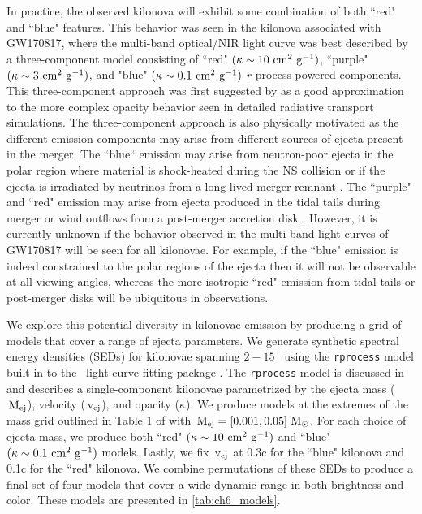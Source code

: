 In practice, the observed kilonova will exhibit some combination of both ``red" and ``blue" features. This behavior was seen in the kilonova associated with GW170817, where the multi-band optical/NIR light curve was best described by a three-component model consisting of ``red"  $(\kappa \sim10 \rm\ cm^2\ g^{-1})$, ``purple"  $(\kappa \sim3 \rm\ cm^2\ g^{-1})$, and "blue"  $(\kappa \sim0.1 \rm\ cm^2\ g^{-1})$ $r$-process powered components. This three-component approach was first suggested by \citet{Tanaka+17} as a good approximation to the more complex opacity behavior seen in detailed radiative transport simulations. The three-component approach is also physically motivated as the different emission components may arise from different sources of ejecta present in the merger. The ``blue`` emission may arise from neutron-poor ejecta in the polar region where material is shock-heated during the NS collision \citep{Oechslin+07,Bauswein+13a,Sekiguchi+16} or if the ejecta is irradiated by neutrinos from a long-lived merger remnant \citep{FernandezMetzger13,Just+15,Kasen+15}. The ``purple" and ``red" emission may arise from ejecta produced in the tidal tails during merger \cite{Rosswog+99,Hotokezaka+13} or wind outflows from a post-merger accretion disk \citep{Just+15,SiegelMetzger17}. However, it is currently unknown if the behavior observed in the multi-band light curves of GW170817 will be seen for all kilonovae. For example, if the ``blue" emission is indeed constrained to the polar regions of the ejecta then it will not be observable at all viewing angles, whereas the more isotropic ``red" emission from tidal tails or post-merger disks will be ubiquitous in observations.

We explore this potential diversity in kilonovae emission by producing a grid of models that cover a range of ejecta parameters. We generate synthetic spectral energy densities (SEDs) for kilonovae spanning $2-15$ \micron\ using the {\tt rprocess} model built-in to the \mosfit\ light curve fitting package \citep{Guillochon+17b,Nicholl+17b}. The {\tt rprocess} model is discussed in \citet{Villar+17a} and describes a single-component kilonovae \citep{Metzger2017} parametrized by the ejecta mass ($\rm\,M_{\rm ej}$), velocity ($\rm\,v_{\rm ej}$), and opacity ($\kappa$). We produce models at the extremes of the mass grid outlined in Table 1 of \citet{Barnes+16} with $\rm\,M_{\rm ej} = [0.001, 0.05]\,{\rm\,M_\odot}$. For each choice of ejecta mass, we produce both ``red" $(\kappa \sim10 \rm\ cm^2\ g^{-1})$ and ``blue" $(\kappa \sim0.1 \rm\ cm^2\ g^{-1})$ models. Lastly, we fix $\rm\,v_{\rm ej}$ at 0.3c for the ``blue" kilonova and 0.1c for the ``red" kilonova. We combine permutations of these SEDs to produce a final set of four models that cover a wide dynamic range in both brightness and color. These models are presented in \cref{tab:ch6_models}.

